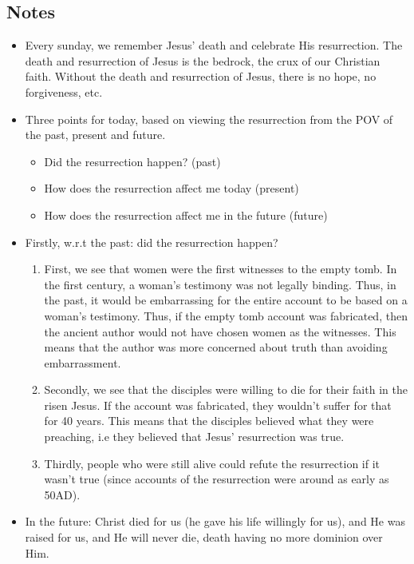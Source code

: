 \subsection*{Notes}
\begin{itemize}
  \item{Every sunday, we remember Jesus’ death and celebrate His resurrection. The death and resurrection of Jesus is the bedrock, the crux of our Christian faith. Without the death and resurrection of Jesus, there is no hope, no forgiveness, etc.}
  \item{Three points for today, based on viewing the resurrection from the POV of the past, present and future.
  \begin{itemize}
    \item{Did the resurrection happen? (past)}
    \item{How does the resurrection affect me today (present)}
    \item{How does the resurrection affect me in the future (future)}
  \end{itemize}}
  \item{Firstly, w.r.t the past: did the resurrection happen?
  \begin{enumerate}
    \item{First, we see that women were the first witnesses to the empty tomb. In the first century, a woman’s testimony was not legally binding. Thus, in the past, it would be embarrassing for the entire account to be based on a woman’s testimony. Thus, if the empty tomb account was fabricated, then the ancient author would not have chosen women as the witnesses. This means that the author was more concerned about truth than avoiding embarrassment.}
    \item{Secondly, we see that the disciples were willing to die for their faith in the risen Jesus. If the account was fabricated, they wouldn’t suffer for that for 40 years. This means that the disciples believed what they were preaching, i.e they believed that Jesus’ resurrection was true.}
    \item{Thirdly, people who were still alive could refute the resurrection if it wasn’t true (since accounts of the resurrection were around as early as 50AD).}
  \end{enumerate}}
  \item{In the future: Christ died for us (he gave his life willingly for us), and He was raised for us, and He will never die, death having no more dominion over Him. 
  \begin{enumerate}

\end{enumerate}}
\end{itemize}
